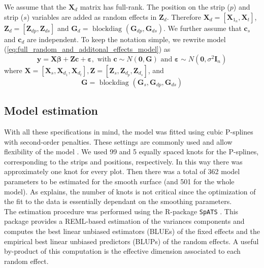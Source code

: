 We assume that the $\boldsymbol{X}_{d}$ matrix has full-rank. 
The position on the strip ($p$) and strip ($s$) variables are added as random effects in $\mathbf{Z}_{d}$. 
Therefore $\mathbf{X}_{d} = 
\left[ 
	\mathbf{X}_{1_n},\mathbf{X}_{t} 
\right]$, 
$\boldsymbol{Z}_{d}=
\left[
	\boldsymbol{Z}_{dp}, \boldsymbol{Z}_{ds}
\right]$ and 
$\boldsymbol{G}_{d}= 
\text{ blockdiag }
\left(
	\boldsymbol{G}_{dp}, \boldsymbol{G}_{ds}
\right)$. 
We further assume that $\boldsymbol{c}_s$ and $\boldsymbol{c}_d$ are independent.
To keep the notation simple, we rewrite model (\ref{eq:full_random_and_additonal_effects_model}) as
\begin{equation}
    \boldsymbol{y}=
    \boldsymbol{X} \boldsymbol{\beta}+
    \boldsymbol{Z} \boldsymbol{c}+
    \boldsymbol{\varepsilon}, 
    \text { with } 
    \boldsymbol{c} \sim N(\mathbf{0}, \boldsymbol{G}) 
    \text { and } 
    \boldsymbol{\varepsilon} \sim N\left(\mathbf{0}, \sigma^{2} \boldsymbol{I}_{n}\right)
\end{equation}
where $\boldsymbol{X}=
\left[
	\boldsymbol{X}_{s}, \boldsymbol{X}_{d_{1}}, \mathbf{X}_{d_{t}} 
\right], 
\boldsymbol{Z}=
\left[
	\boldsymbol{Z}_{s}, \boldsymbol{Z}_{d_{p}}, \mathbf{Z}_{d_{s}}
\right]$, and 
\begin{equation}
    \boldsymbol{G}=\text { blockdiag }\left(\boldsymbol{G}_{s}, \boldsymbol{G}_{dp}, \boldsymbol{G}_{ds} \right)
\end{equation}

\subsection{Model estimation}
With all these specifications in mind, the model was fitted using cubic P-splines with second-order penalties. These settings are commonly used and allow flexibility of the model \parencite{rodriguez-alvarez_correcting_2018,rodriguez-alvarez_spatial_2016,rodriguez-alvarez_fast_2015}. We used 99 and 5 equally spaced knots for the P-splines, corresponding to the strips and positions, respectively. In this way there was approximately one knot for every plot. Then there was a total of 362 model parameters to be estimated for the smooth surface (and 501 for the whole model). As \textcite{rodriguez-alvarez_correcting_2018} explains, the number of knots is not critical since the optimization of the fit to the data is essentially dependant on the smoothing parameters.\\
The estimation procedure was performed using the R-package \texttt{SpATS} \parencite{rodriguez-alvarez_spats:_2016}. This package provides a REML-based estimation of the variances components and computes the best linear unbiased estimators (BLUEs) of the fixed effects and the empirical best linear unbiased predictors (BLUPs) of the random effects. A useful by-product of this computation is the effective dimension associated to each random effect.


